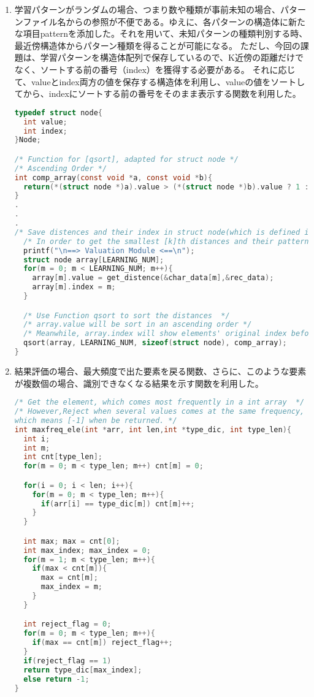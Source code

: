 \documentclass[ %
  uplatex,%
  papersize%
]{jsarticle}
\begin{document}
\begin{enumerate}
\small
\item 学習パターンがランダムの場合、つまり数や種類が事前未知の場合、パターンファイル名からの参照が不便である。ゆえに、各パターンの構造体に新たな項目patternを添加した。それを用いて、未知パターンの種類判別する時、最近傍構造体からパターン種類を得ることが可能になる。
ただし、今回の課題は、学習パターンを構造体配列で保存しているので、K近傍の距離だけでなく、ソートする前の番号（index）を獲得する必要がある。
それに応じて、valueとindex両方の値を保存する構造体を利用し、valueの値をソートしてから、indexにソートする前の番号をそのまま表示する関数を利用した。
\begin{lstlisting}[language=c,caption=value/index struct sort,]
typedef struct node{
  int value;
  int index;
}Node;

/* Function for [qsort], adapted for struct node */
/* Ascending Order */
int comp_array(const void *a, const void *b){
  return(*(struct node *)a).value > (*(struct node *)b).value ? 1 : -1;
}
.
.
.
/* Save distences and their index in struct node(which is defined in sort.h) */
  /* In order to get the smallest [k]th distances and their patterns  */
  printf("\n==> Valuation Module <==\n");
  struct node array[LEARNING_NUM];
  for(m = 0; m < LEARNING_NUM; m++){
    array[m].value = get_distence(&char_data[m],&rec_data);
    array[m].index = m;
  }

  /* Use Function qsort to sort the distances  */
  /* array.value will be sort in an ascending order */
  /* Meanwhile, array.index will show elements' original index before sorting */
  qsort(array, LEARNING_NUM, sizeof(struct node), comp_array);
}

\end{lstlisting}

\item 結果評価の場合、最大頻度で出た要素を戻る関数、さらに、このような要素が複数個の場合、識別できなくなる結果を示す関数を利用した。

\begin{lstlisting}[language=c,caption=evaluation part]
/* Get the element, which comes most frequently in a int array  */
/* However,Reject when several values comes at the same frequency,
which means [-1] when be returned. */
int maxfreq_ele(int *arr, int len,int *type_dic, int type_len){
  int i;
  int m;
  int cnt[type_len];
  for(m = 0; m < type_len; m++) cnt[m] = 0;

  for(i = 0; i < len; i++){
    for(m = 0; m < type_len; m++){
      if(arr[i] == type_dic[m]) cnt[m]++;
    }
  }

  int max; max = cnt[0];
  int max_index; max_index = 0;
  for(m = 1; m < type_len; m++){
    if(max < cnt[m]){
      max = cnt[m];
      max_index = m;
    }
  }

  int reject_flag = 0;
  for(m = 0; m < type_len; m++){
    if(max == cnt[m]) reject_flag++;
  }
  if(reject_flag == 1)
  return type_dic[max_index];
  else return -1;
}

\end{lstlisting}
\end{enumerate}
\end{document}
